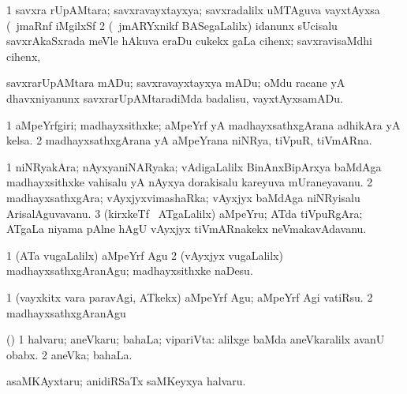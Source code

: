 {\bentry
{} 
\gl{\nA}
\expl{}
\bmng
\bnum
\num{1} savxra rUpAMtara; savxravayxtayxya; savxradalilx uMTAguva vayxtAyxsa (\udA\ jmaRnf  iMgilxSf  
\num{2} (\kanmu\ jmARYxnikf BASegaLalilx) idanunx sUcisalu savxrAkaSxrada meVle hAkuva eraDu cukekx\eng{$\ddot{\phantom{a}}$} gaLa cihenx; savxravisaMdhi cihenx, \udA\  
\enum
\emng
\eentry

\bentry
{} 
\gl{\sakirx}
\expl{}
\bmng
savxrarUpAMtara mADu; savxravayxtayxya mADu; oMdu racane yA dhavxniyanunx savxrarUpAMtaradiMda badalisu, vayxtAyxsamADu. 
\emng
\eentry

\bentry
{} 
\gl{\nA}
\expl{}
\bmng
\bnum
\num{1} aMpeYrfgiri; madhayxsithxke; aMpeYrf yA madhayxsathxgArana adhikAra yA kelsa. 
\num{2} madhayxsathxgArana yA aMpeYrana niNRya, tiVpuR, tiVmARna. 
\enum
\emng
\eentry

\bentry
{} 
\gl{\nA}
\expl{}
\bmng
\bnum
\num{1} niNRyakAra; nAyxyaniNARyaka; vAdigaLalilx BinAnxBipArxya baMdAga madhayxsithxke vahisalu yA nAyxya dorakisalu kareyuva mUraneyavanu. 
\num{2} madhayxsathxgAra; vAyxjyxvimashaRka; vAyxjyx baMdAga niNRyisalu ArisalAguvavanu. 
\num{3} (kirxkeTf \mo\ ATgaLalilx) aMpeYru; ATda tiVpuRgAra; ATgaLa niyama pAlne hAgU vAyxjyx tiVmARnakekx neVmakavAdavanu. 
\enum
\emng
\eentry

\bentry
{} 
\gl{\sakirx}
\expl{}
\bmng
\bnum
\num{1} (ATa \mo vugaLalilx) aMpeYrf Agu 
\num{2} (vAyxjyx \mo vugaLalilx) madhayxsathxgAranAgu; madhayxsithxke naDesu. 
\enum
\emng

\noindent 
\gl{\akirx}
\expl{}
\bmng
\bnum
\num{1} (vayxkitx \mo vara paravAgi, ATkekx) aMpeYrf Agu; aMpeYrf Agi vatiRsu. 
\num{2} madhayxsathxgAranAgu 
\enum
\emng
\eentry

\bentry
{} 
\gl{\nA}
\expl{}
\bmng
{} 
\emng
\eentry

\bentry
{} 
\gl{\gu}
\expl{}
\bmng
(\ashi) 
\bnum
\num{1} halvaru; aneVkaru; bahaLa; vipariVta:  alilxge baMda aneVkaralilx avanU obabx. 
\num{2} aneVka; bahaLa. 
\enum
\emng
\eentry

\bentry
{} 
\gl{\sanA}
\expl{}
\bmng
asaMKAyxtaru; anidiRSaTx saMKeyxya halvaru. 
\emng
\eentry

}
